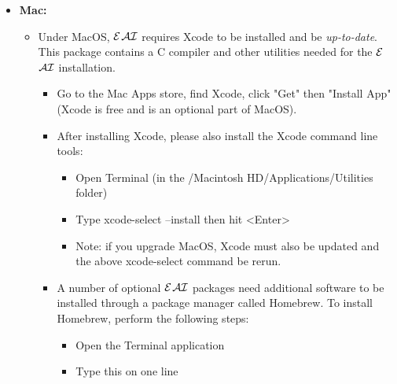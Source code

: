 \documentclass[11pt]{article}
\newcommand{\ERGOAI}{\mbox{{\ensuremath{\cal{E}}\smaller{{\sc{RGO}}}}\ensuremath{\cal{AI}}}\xspace}
\begin{document}
\begin{itemize}
\begin{itemize}
\begin{quote}
    \end{quote}
    For instance,
    \begin{quote}
      \texttt{
      apt search .*curl.*-dev.* 
      }
    \end{quote}
    Here is partial output of the above command on Ubuntu 24:
\begin{verbatim}
v   libcurl-dev          
v   libcurl-ssl-dev     
v   libcurl3-dev       
v   libcurl3-openssl-dev   
v   libcurl4-dev          
i   libcurl4-openssl-dev
\end{verbatim}
    RPM-based Linuxes, such as CentOS, use  
    \begin{quote}
      \texttt{
      yum list regular-expression
      }
    \end{quote}
  \end{itemize}
\item[] \textbf{Mac:}
  \begin{itemize}
  \item Under MacOS, \ERGOAI requires Xcode to be installed and be
    \emph{up-to-date}.  This package contains a C compiler and other
    utilities needed for the \ERGOAI installation.
    \begin{itemize}
    \item Go to the Mac Apps store, find Xcode, click "Get" then "Install
      App" (Xcode is free and is an optional part of MacOS).
    \item After installing Xcode, please also install the Xcode command
      line tools:
      \begin{itemize}
      \item Open Terminal (in the /Macintosh HD/Applications/Utilities
        folder)
      \item Type xcode-select --install then hit <Enter>
      \item Note: if you upgrade MacOS, Xcode must also be updated and the
        above xcode-select command be rerun.
      \end{itemize}
    \item A number of optional \ERGOAI packages need additional software to be
      installed through a package manager called Homebrew. To install
      Homebrew, perform the following steps:
      \begin{itemize}
      \item Open the Terminal application
      \item Type this on one line
        \\

\end{itemize}
\end{itemize}
\end{itemize}
\end{itemize}
\end{document}
